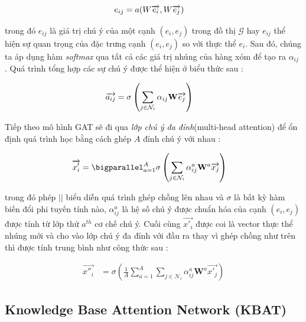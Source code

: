 \begin{align}
\centering
{e_{ij}}&={a(W \overrightarrow{e_i}, W \overrightarrow{e_j})}
\end{align}

trong đó $e_{ij}$ là giá trị chú ý của một cạnh $(e_i, e_j)$ trong đồ thị $\mathcal{G}$ hay $e_{ij}$ thể hiện sự quan trọng của đặc trưng cạnh $(e_i, e_j)$ so với thực thể $e_i$. Sau đó, chúng ta áp dụng hàm \textit{softmax} qua tất cả các giá trị nhúng của hàng xóm để tạo ra $\alpha_{ij}$ . Quá trình tổng hợp các sự chú ý được thể hiện ở biểu thức sau : 

\begin{align}
\centering
{\overrightarrow{a_{ij}}}&={\sigma\left(\sum_{j\in \mathcal{N}_i} {\alpha_{ij} \mathbf{W} \overrightarrow{e_j} }\right)}
\end{align}

Tiếp theo mô hình GAT sẽ đi qua \textit{lớp chú ý đa đỉnh}(multi-head attention) để ổn định quá trình học bằng cách ghép $A$ đỉnh chú ý với nhau :

\begin{align}
{\overrightarrow{x'_i}}&={\bigparallel_{a=1}^{A}\sigma\left(\sum_{j\in \mathcal{N}_i}\alpha_{ij}^{a} \mathbf{W}^{a} \overrightarrow{x_{j}} \right)}
\end{align}

trong đó phép $||$ biểu diễn quá trình ghép chồng lên nhau và $\sigma$ là bất kỳ hàm biến đổi phi tuyến tính nào, $\alpha_{ij}^a$ là hệ số chú ý được chuẩn hóa của cạnh $(e_i, e_j)$ được tính từ lớp thứ $a^{th}$	 cơ chế chú ý. Cuối cùng $\overrightarrow{x'_i}$ được coi là vector thực thể nhúng mới và cho vào lớp chú ý đa đỉnh với đầu ra thay vì ghép chồng như trên thì được tính trung bình như công thức sau :

\begin{align}
{\overrightarrow{x''_i}}&={\sigma\left(\frac{1}{A} \sum_{a=1}^{A}\sum_{j\in \mathcal{N}_i}\alpha_{ij}^{a} \mathbf{W}^{a} \overrightarrow{x'_{j}} \right)}
\end{align}

\subsection{Knowledge Base Attention Network (KBAT)}

